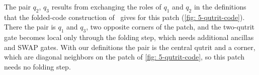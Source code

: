 The pair $q_2$, $q_3$ results from exchanging the roles of $q_1$ and $q_2$ in the definitions that the folded-code construction of~\cite{Moussa2016} gives for this patch (\autoref{fig: 5-qutrit-code}). There the pair is $q_1$ and $q_3$, two opposite corners of the patch, and the two-qutrit gate becomes local only through the folding step, which needs additional ancillas and SWAP gates. With our definitions the pair is the central qutrit and a corner, which are diagonal neighbors on the patch of \autoref{fig: 5-qutrit-code}, so this patch needs no folding step.


